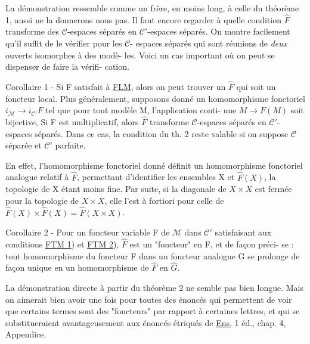 \newpage



La démonstration ressemble comme un frère, en moins long, à celle
du théorème 1, aussi ne la donnerons nous pas. Il faut encore regarder
à quelle condition $\hat{F}$ transforme des $\mathcal{C}$-espaces séparés en $\mathcal{C}'$-espaces
séparés. On montre facilement qu'il suffit de le vérifier pour les $\mathcal{C}$-
espaces séparés qui sont réunions de \emph{deux} ouverts isomorphes à des modè-
les. Voici un cas important où on peut se dispenser de faire la vérifi-
cation.

Corollaire 1 - Si F satisfait à \underline{FLM}, alors on peut trouver un $\hat{F}$ qui soit
un foncteur local. Plus généralement, supposons donné un homomorphisme
fonctoriel $i_{\mathcal{M}} \to i_{\mathcal{C}'} F$ tel que pour tout modèle M, l'application conti-
nue $M \to F(M)$ soit bijective, Si F est multiplicatif, alors $\hat{F}$ transforme
$\mathcal{C}$-espaces séparés en $\mathcal{C}'$-espaces séparés. Dans ce cas, la condition
du th. 2 reste valable si on suppose $\mathcal{C}$ séparée et $\mathcal{C}'$ parfaite.

En effet, l'homomorphisme fonctoriel donné définit un homomorphisme
fonctoriel analogue relatif à $\hat{F}$, permettant d'identifier les ensembles
X et $\hat{F}(X)$, la topologie de X étant moins fine. Par suite, si la diagonale
de $X \times X$ est fermée pour la topologie de $X \times X$, elle l'est à fortiori pour
celle de $\hat{F}(X) \times \hat{F}(X) = \hat{F}(X \times X)$.

Corollaire 2 - Pour un foncteur variable F de $\mathcal{M}$ dans $\mathcal{C}'$ satisfaisant aux
conditions \underline{FTM 1}) et \underline{FTM 2}), $\hat{F}$ est un "foncteur" en F, et de façon préci-
se : tout homomorphisme du foncteur F dans un foncteur analogue G se
prolonge de façon unique en un homomorphisme de $\hat{F}$ en $\hat{G}$.

La démonstration directe à partir du théorème 2 ne semble pas bien
longue. Mais on aimerait bien avoir une fois pour toutes des énoncés qui
permettent de voir que certains termes sont des "foncteurs" par rapport
à certaines lettres, et qui se substitueraient avantageusement aux énoncés
étriqués de \underline{Ens}, 1 éd., chap. 4, Appendice.

\newpage



